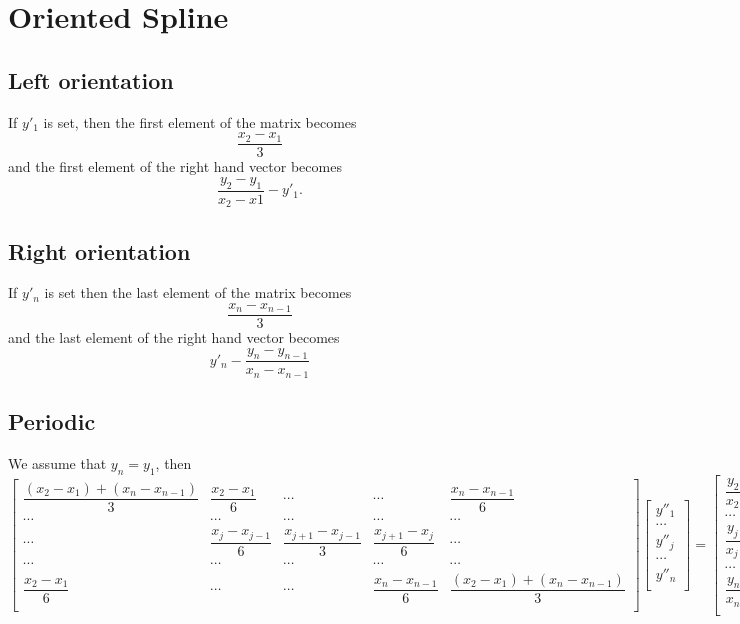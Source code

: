 \documentclass[aps]{revtex4}
\begin{document}
\section{Oriented Spline}
\subsection{Left orientation}
If $y'_1$ is set, then the first element of the matrix becomes
$$
	\dfrac{x_2-x_1}{3}
$$
and the first element of the right hand vector becomes
$$
	\dfrac{y_2-y_1}{x_2-x1} - y'_1.
$$
\subsection{Right orientation}
If $y'_n$ is set then the last element of the matrix becomes
$$
	\dfrac{x_n-x_{n-1}}{3}
$$
and the last element of the right hand vector becomes
$$
	y'_n - \dfrac{y_n-y_{n-1}}{x_n-x_{n-1}}
$$
\subsection{Periodic}
We assume that $y_n=y_1$, then
$$
	\begin{bmatrix}
		\dfrac{\left(x_2-x_1\right)+\left(x_n-x_{n-1}\right)}{3} & \dfrac{x_2-x_1}{6} & \cdots & \cdots & \dfrac{x_n-x_{n-1}}{6}\\
		\cdots & \cdots & \cdots & \cdots & \cdots \\
		\cdots & \dfrac{x_{j}-x_{j-1}}{6} & \dfrac{x_{j+1}-x_{j-1}}{3} & \dfrac{x_{j+1}-x_{j}}{6} & \cdots\\
		\cdots & \cdots & \cdots & \cdots & \cdots \\
		\dfrac{x_2-x_1}{6} & \cdots & \cdots & \dfrac{x_n-x_{n-1}}{6} & \dfrac{\left(x_2-x_1\right)+\left(x_n-x_{n-1}\right)}{3} \\
	\end{bmatrix}
	\begin{bmatrix}
	y''_1\\
	\cdots\\
	y''_j\\
	\cdots\\
	y''_n\\
	\end{bmatrix}
	=
	\begin{bmatrix}
	\dfrac{y_2-y_1}{x_2-x_1}-\dfrac{y_n-y_{n-1}}{x_n-x_{n-1}}\\
	\cdots\\
	\dfrac{y_{j+1}-y_{j}}{x_{j+1}-x_{j}} - \dfrac{y_j-y_{j-1}}{x_j-x_{j-1}}\\
	\cdots\\
	\dfrac{y_n-y_{n-1}}{x_n-x_{n-1}}-\dfrac{y_2-y_1}{x_2-x_1}\\
	\end{bmatrix}
$$
\end{document}
